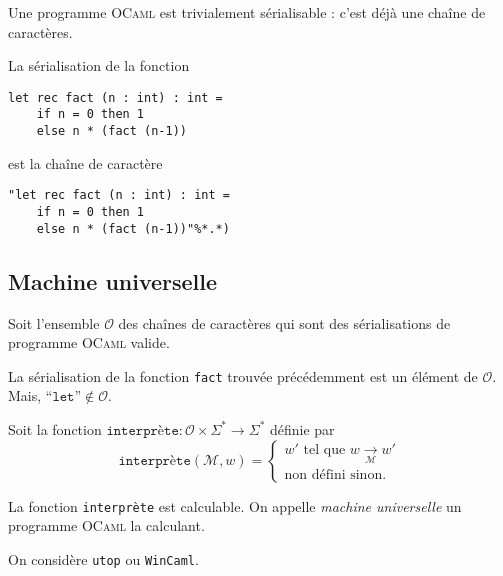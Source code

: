 \begin{rmk}
	Une programme \textsc{OCaml} est trivialement sérialisable : c'est déjà une chaîne de caractères.
\end{rmk}

\begin{exm}
	La sérialisation de la fonction
	\begin{lstlisting}[language=caml,caption=Fonction factorielle en \textsc{OCaml}]
let rec fact (n : int) : int = 
	if n = 0 then 1
	else n * (fact (n-1))
	\end{lstlisting}
	est la chaîne de caractère 
	\begin{lstlisting}[language=caml]
"let rec fact (n : int) : int = 
	if n = 0 then 1
	else n * (fact (n-1))"%*.*)
	\end{lstlisting}
\end{exm}

\subsection{Machine universelle}

Soit l'ensemble $\mathscr{O}$ des chaînes de caractères qui sont des sérialisations de programme \textsc{OCaml} valide.

\begin{exm}
	La sérialisation de la fonction \texttt{fact} trouvée précédemment est un élément de $\mathscr{O}$. Mais, $\text{``}\texttt{let}\text{''}\not\in \mathscr{O}$.
\end{exm}

\begin{defn}
	Soit la fonction $\texttt{interprète} : \mathscr{O} \times \Sigma^* \to \Sigma^*$ définie par \[
		\texttt{interprète}(\mathcal{M}, w) = \begin{cases}
			w' \text{ tel que } w \xrightarrow[\mathcal{M}]{} w'\\
			\text{non défini sinon}.
		\end{cases}
	\]
\end{defn}

\begin{thm}
	La fonction \texttt{interprète} est calculable. On appelle \textit{machine universelle} un programme \textsc{OCaml} la calculant.
\end{thm}

\begin{prv}
	On considère \texttt{utop} ou \texttt{WinCaml}.
\end{prv}

